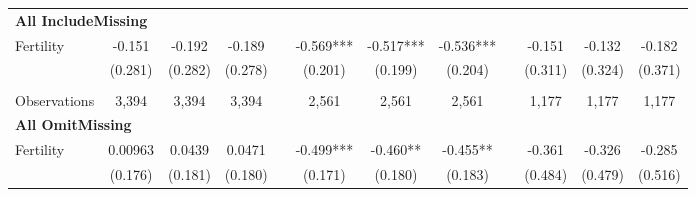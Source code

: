 \begin{landscape}
\begin{table}[htpb!]
\begin{center}
\begin{tabular}{lcccp{2mm}cccp{2mm}ccc}
\multicolumn{12}{l}{\textbf{All IncludeMissing}}\\ 
Fertility&-0.151&-0.192&-0.189&&-0.569***&-0.517***&-0.536***&&-0.151&-0.132&-0.182\\
&(0.281)&(0.282)&(0.278)&&(0.201)&(0.199)&(0.204)&&(0.311)&(0.324)&(0.371)\\
\begin{footnotesize}\end{footnotesize}&\begin{footnotesize}\end{footnotesize}&\begin{footnotesize}\end{footnotesize}&\begin{footnotesize}\end{footnotesize}&\begin{footnotesize}\end{footnotesize}&\begin{footnotesize}\end{footnotesize}&\begin{footnotesize}\end{footnotesize}&\begin{footnotesize}\end{footnotesize}&\begin{footnotesize}\end{footnotesize}&\begin{footnotesize}\end{footnotesize}&\begin{footnotesize}\end{footnotesize}&\begin{footnotesize}\end{footnotesize}\\Observations&3,394&3,394&3,394&&2,561&2,561&2,561&&1,177&1,177&1,177\\
\multicolumn{12}{l}{\textbf{All OmitMissing}}\\ 
Fertility&0.00963&0.0439&0.0471&&-0.499***&-0.460**&-0.455**&&-0.361&-0.326&-0.285\\
&(0.176)&(0.181)&(0.180)&&(0.171)&(0.180)&(0.183)&&(0.484)&(0.479)&(0.516)\\

\end{tabular}
\end{center}
\end{table}
\end{landscape}
